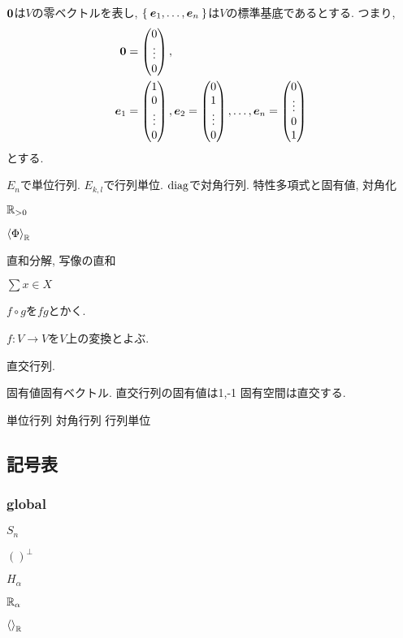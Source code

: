 $\boldsymbol{0}$は$V$の零ベクトルを表し,
$\Set{\boldsymbol{e}_1,\ldots,\boldsymbol{e}_n}$は$V$の標準基底であるとする.
つまり,
\begin{align*}
 \boldsymbol{0}&=\begin{pmatrix}0\\\vdots\\0\end{pmatrix},\\
 \boldsymbol{e}_1&=\begin{pmatrix}1\\0\\\vdots\\0\end{pmatrix},
 \boldsymbol{e}_2=\begin{pmatrix}0\\1\\\vdots\\0\end{pmatrix},
 \ldots,
 \boldsymbol{e}_n=\begin{pmatrix}0\\\vdots\\0\\1\end{pmatrix}
\end{align*}
とする.

$E_n$で単位行列.
$E_{k,l}$で行列単位.
$\operatorname{diag}$で対角行列.
特性多項式と固有値, 対角化

$\mathbb{R}_{>0}$

$\Braket{\Phi}_{\mathbb{R}}$

直和分解, 写像の直和

$\sum{x\in X}$

$f\circ g$を$fg$とかく.

$f\colon V\to V$を$V$上の変換とよぶ.

直交行列.

固有値固有ベクトル.
直交行列の固有値は1,-1
固有空間は直交する.

単位行列
対角行列
行列単位


\subsection{記号表}
\subsubsection{global}
$S_n$

$()^{\perp}$

$H_\alpha$

$\mathbb{R}_\alpha$

$\Braket{}_{\mathbb{R}}$


